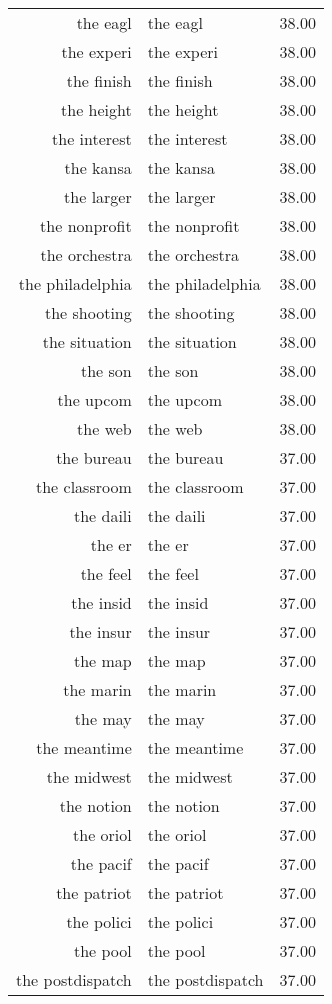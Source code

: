 \begin{table}[ht]
\begin{tabular}{rlr}
  the eagl & the eagl & 38.00 \\ 
  the experi & the experi & 38.00 \\ 
  the finish & the finish & 38.00 \\ 
  the height & the height & 38.00 \\ 
  the interest & the interest & 38.00 \\ 
  the kansa & the kansa & 38.00 \\ 
  the larger & the larger & 38.00 \\ 
  the nonprofit & the nonprofit & 38.00 \\ 
  the orchestra & the orchestra & 38.00 \\ 
  the philadelphia & the philadelphia & 38.00 \\ 
  the shooting & the shooting & 38.00 \\ 
  the situation & the situation & 38.00 \\ 
  the son & the son & 38.00 \\ 
  the upcom & the upcom & 38.00 \\ 
  the web & the web & 38.00 \\ 
  the bureau & the bureau & 37.00 \\ 
  the classroom & the classroom & 37.00 \\ 
  the daili & the daili & 37.00 \\ 
  the er & the er & 37.00 \\ 
  the feel & the feel & 37.00 \\ 
  the insid & the insid & 37.00 \\ 
  the insur & the insur & 37.00 \\ 
  the map & the map & 37.00 \\ 
  the marin & the marin & 37.00 \\ 
  the may & the may & 37.00 \\ 
  the meantime & the meantime & 37.00 \\ 
  the midwest & the midwest & 37.00 \\ 
  the notion & the notion & 37.00 \\ 
  the oriol & the oriol & 37.00 \\ 
  the pacif & the pacif & 37.00 \\ 
  the patriot & the patriot & 37.00 \\ 
  the polici & the polici & 37.00 \\ 
  the pool & the pool & 37.00 \\ 
  the postdispatch & the postdispatch & 37.00 \\ 

\end{tabular}
\end{table}
